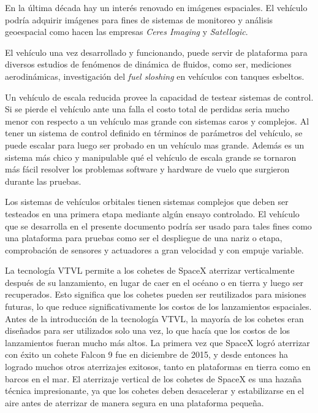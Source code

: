 \medskip

En la última década hay un interés renovado en imágenes espaciales. El vehículo podría adquirir imágenes para fines de sistemas de monitoreo y análisis geoespacial como hacen las empresas \textit{Ceres Imaging} y \textit{Satellogic}. %

\medskip

El vehículo una vez desarrollado y funcionando, puede servir de plataforma para diversos
estudios de fenómenos de dinámica de fluidos, como ser, mediciones aerodinámicas,
investigación del \textit{fuel sloshing} en vehículos con tanques esbeltos.

\medskip

Un vehículo de escala reducida provee la capacidad de testear sistemas de control. Si se pierde el vehículo ante una falla el costo total de perdidas seria mucho menor con respecto a un vehículo mas grande con sistemas caros y complejos. Al tener un sistema de control definido en términos de parámetros del vehículo, se puede escalar para luego ser probado en un vehículo mas grande. Además es un sistema más chico y manipulable qué el vehículo de escala grande se tornaron más fácil resolver los problemas software y hardware de vuelo que surgieron durante las pruebas.

\medskip


Los sistemas de vehículos orbitales tienen sistemas complejos que deben ser testeados en una primera etapa mediante algún ensayo controlado. El vehículo que se desarrolla en el presente documento podría ser usado para tales fines como una plataforma para pruebas como ser el despliegue de una nariz o etapa, comprobación de sensores y actuadores a gran velocidad y con empuje variable.

\medskip

La tecnología VTVL permite a los cohetes de SpaceX aterrizar verticalmente después de su lanzamiento, en lugar de caer en el océano o en tierra y luego ser recuperados. Esto significa que los cohetes pueden ser reutilizados para misiones futuras, lo que reduce significativamente los costos de los lanzamientos espaciales. Antes de la introducción de la tecnología VTVL, la mayoría de los cohetes eran diseñados para ser utilizados solo una vez, lo que hacía que los costos de los lanzamientos fueran mucho más altos.
La primera vez que SpaceX logró aterrizar con éxito un cohete Falcon 9 fue en diciembre de 2015, y desde entonces ha logrado muchos otros aterrizajes exitosos, tanto en plataformas en tierra como en barcos en el mar. El aterrizaje vertical de los cohetes de SpaceX es una hazaña técnica impresionante, ya que los cohetes deben desacelerar y estabilizarse en el aire antes de aterrizar de manera segura en una plataforma pequeña.


